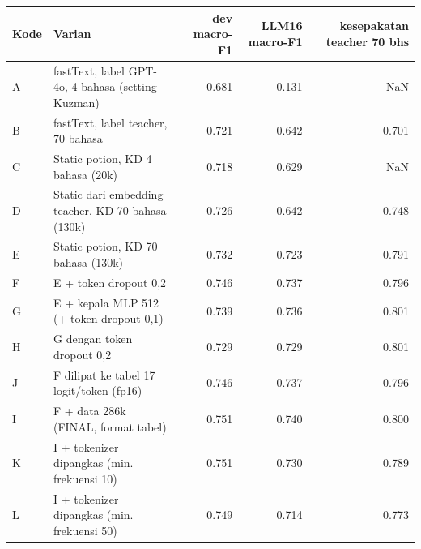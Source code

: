 \begin{tabular}{llrrr}
\toprule
Kode & Varian & dev macro-F1 & LLM16 macro-F1 & kesepakatan teacher 70 bhs \\
\midrule
A & fastText, label GPT-4o, 4 bahasa (setting Kuzman) & 0.681 & 0.131 & NaN \\
B & fastText, label teacher, 70 bahasa & 0.721 & 0.642 & 0.701 \\
C & Static potion, KD 4 bahasa (20k) & 0.718 & 0.629 & NaN \\
D & Static dari embedding teacher, KD 70 bahasa (130k) & 0.726 & 0.642 & 0.748 \\
E & Static potion, KD 70 bahasa (130k) & 0.732 & 0.723 & 0.791 \\
F & E + token dropout 0,2 & 0.746 & 0.737 & 0.796 \\
G & E + kepala MLP 512 (+ token dropout 0,1) & 0.739 & 0.736 & 0.801 \\
H & G dengan token dropout 0,2 & 0.729 & 0.729 & 0.801 \\
J & F dilipat ke tabel 17 logit/token (fp16) & 0.746 & 0.737 & 0.796 \\
I & F + data 286k (FINAL, format tabel) & 0.751 & 0.740 & 0.800 \\
K & I + tokenizer dipangkas (min. frekuensi 10) & 0.751 & 0.730 & 0.789 \\
L & I + tokenizer dipangkas (min. frekuensi 50) & 0.749 & 0.714 & 0.773 \\
\bottomrule
\end{tabular}
